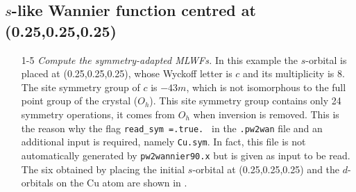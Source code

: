 \subsection*{$s$-like Wannier function centred at (0.25,0.25,0.25)}
\begin{itemize}
	\item [1-5] {\it Compute the symmetry-adapted MLWFs.}
	In this example the $s$-orbital is placed at (0.25,0.25,0.25), whose Wyckoff letter is $c$ and its multiplicity is $8$. The site symmetry group of $c$ is ${-}43m$, which is not isomorphous to the full point group of the crystal ($O_h$). This site symmetry group contains only 24 symmetry operations, \ie{} it comes from $O_h$ when inversion is removed. This is the reason why the flag {\tt read\_sym =.true. } in the {\tt .pw2wan} file and an additional input is required, namely {\tt Cu.sym}. In fact, this file is not automatically generated by {\tt pw2wannier90.x} but is given as input to be read.
    The six \MLWFs{} obtained by placing the initial $s$-orbital at (0.25,0.25,0.25) and the $d$-orbitals on the Cu atom are shown in .  
\end{itemize}

